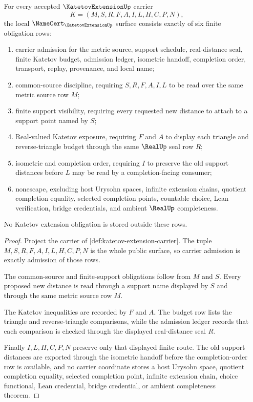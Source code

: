 \begin{theorem}
\label{thm:katetov-extension-namecert-obligations}
For every accepted $\KatetovExtensionUp$ carrier
$$
K=(M,S,R,F,A,I,L,H,C,P,N),
$$
the local $\NameCert_{\KatetovExtensionUp}$ surface consists exactly of six finite obligation rows:
\begin{enumerate}
\item carrier admission for the metric source, support schedule, real-distance seal, finite Katetov budget, admission ledger, isometric handoff, completion order, transport, replay, provenance, and local name;
\item common-source discipline, requiring $S,R,F,A,I,L$ to be read over the same metric source row $M$;
\item finite support visibility, requiring every requested new distance to attach to a support point named by $S$;
\item Real-valued Katetov exposure, requiring $F$ and $A$ to display each triangle and reverse-triangle budget through the same $\RealUp$ seal row $R$;
\item isometric and completion order, requiring $I$ to preserve the old support distances before $L$ may be read by a completion-facing consumer;
\item nonescape, excluding host Urysohn spaces, infinite extension chains, quotient completion equality, selected completion points, countable choice, Lean verification, bridge credentials, and ambient $\RealUp$ completeness.
\end{enumerate}
No Katetov extension obligation is stored outside these rows.
\end{theorem}
\begin{proof}
Project the carrier of \autoref{def:katetov-extension-carrier}. The tuple $M,S,R,F,A,I,L,H,C,P,N$ is the whole public surface, so carrier admission is exactly admission of those rows.

The common-source and finite-support obligations follow from $M$ and $S$. Every proposed new distance is read through a support name displayed by $S$ and through the same metric source row $M$.

The Katetov inequalities are recorded by $F$ and $A$. The budget row lists the triangle and reverse-triangle comparisons, while the admission ledger records that each comparison is checked through the displayed real-distance seal $R$.

Finally $I,L,H,C,P,N$ preserve only that displayed finite route. The old support distances are exported through the isometric handoff before the completion-order row is available, and no carrier coordinate stores a host Urysohn space, quotient completion equality, selected completion point, infinite extension chain, choice functional, Lean credential, bridge credential, or ambient completeness theorem.
\end{proof}

